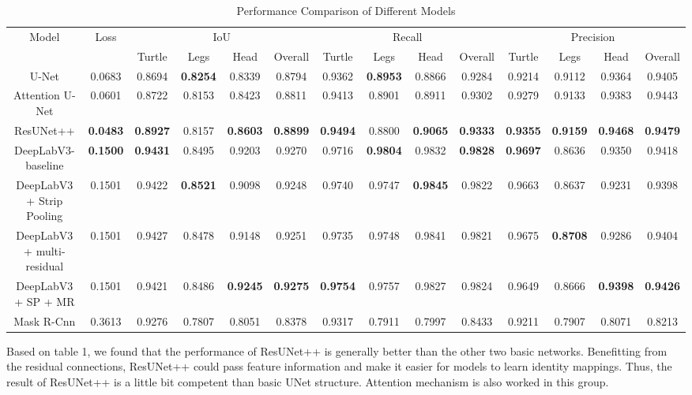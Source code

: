 \documentclass[conference]{IEEEtran}
\begin{document}
\begin{table}[!t]
\centering
\renewcommand{\arraystretch}{1.3} %
\setlength{\tabcolsep}{3pt} %
\caption{Performance Comparison of Different Models}
\begin{tabular}{|c|c|c|c|c|c|c|c|c|c|c|c|c|c|}
\hline
\multirow{2}{*}{Model} & \multirow{2}{*}{Loss} & \multicolumn{4}{c|}{IoU} & \multicolumn{4}{c|}{Recall} & \multicolumn{4}{c|}{Precision} \\ \cline{3-14} 
 &  & Turtle & Legs & Head & Overall & Turtle & Legs & Head & Overall & Turtle & Legs & Head & Overall \\ \hline
U-Net & 0.0683 & 0.8694 & \textbf{0.8254} & 0.8339 & 0.8794 & 0.9362 & \textbf{0.8953} & 0.8866 & 0.9284 & 0.9214 & 0.9112 & 0.9364 & 0.9405 \\ \hline
Attention U-Net & 0.0601 & 0.8722 & 0.8153 & 0.8423 & 0.8811 & 0.9413 & 0.8901 & 0.8911 & 0.9302 & 0.9279 & 0.9133 & 0.9383 & 0.9443 \\ \hline
ResUNet++ & \textbf{0.0483} & \textbf{0.8927} & 0.8157 & \textbf{0.8603} & \textbf{0.8899} & \textbf{0.9494} & 0.8800 & \textbf{0.9065} & \textbf{0.9333} & \textbf{0.9355} & \textbf{0.9159} & \textbf{0.9468} & \textbf{0.9479} \\ \hline
\hline
DeepLabV3-baseline & \textbf{0.1500} & \textbf{0.9431} & 0.8495 & 0.9203 & 0.9270 & 0.9716 & \textbf{0.9804} & 0.9832 & \textbf{0.9828} & \textbf{0.9697} & 0.8636 & 0.9350 & 0.9418 \\ \hline
DeepLabV3 + Strip Pooling & 0.1501 & 0.9422 & \textbf{0.8521} & 0.9098 & 0.9248 & 0.9740 & 0.9747 & \textbf{0.9845} & 0.9822 & 0.9663 & 0.8637 & 0.9231 & 0.9398 \\ \hline
DeepLabV3 + multi-residual & 0.1501 & 0.9427 & 0.8478 & 0.9148 & 0.9251 & 0.9735 & 0.9748 & 0.9841 & 0.9821 & 0.9675 & \textbf{0.8708} & 0.9286 & 0.9404 \\ \hline
DeepLabV3 + SP + MR & 0.1501 & 0.9421 & 0.8486 & \textbf{0.9245} & \textbf{0.9275} & \textbf{0.9754} & 0.9757 & 0.9827 & 0.9824 & 0.9649 & 0.8666 & \textbf{0.9398} & \textbf{0.9426} \\ \hline
\hline
Mask R-Cnn & 0.3613 & 0.9276 & 0.7807 & 0.8051 & 0.8378 & 0.9317 & 0.7911 & 0.7997 & 0.8433 & 0.9211 & 0.7907 & 0.8071 & 0.8213 \\ \hline
\end{tabular}
\end{table}
Based on table 1, we found that the performance of ResUNet++ is generally better than the other two basic networks. Benefitting from the residual connections, ResUNet++ could pass feature information and make it easier for models to learn identity mappings. Thus, the result of ResUNet++ is a little bit competent than basic UNet structure. Attention mechanism is also worked in this group.
\end{document}
